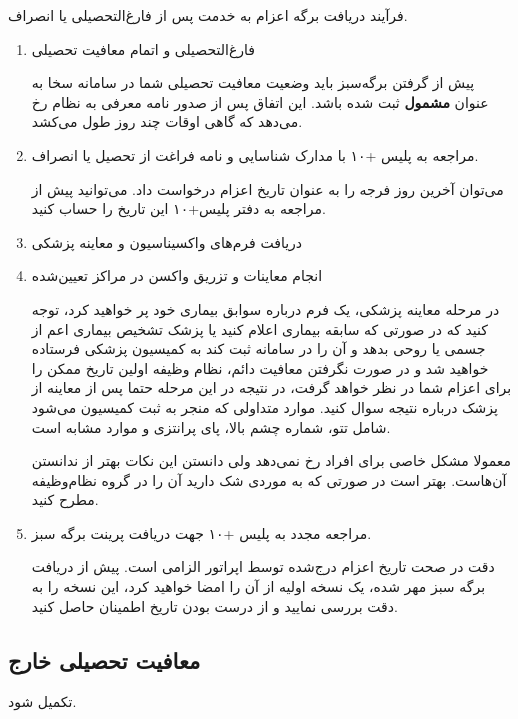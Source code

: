 فرآیند دریافت برگه اعزام به خدمت پس از فارغ‌التحصیلی یا انصراف.

\begin{enumerate}
    \item فارغ‌التحصیلی و اتمام معافیت تحصیلی
    \par\smallskip
    {\small
    پیش از گرفتن برگه‌سبز باید وضعیت معافیت تحصیلی شما در سامانه سخا به عنوان \textbf{مشمول} ثبت شده باشد.
    این اتفاق پس از صدور نامه معرفی به نظام رخ می‌دهد که گاهی اوقات چند روز طول می‌کشد.
    \par}

    \item مراجعه به پلیس +۱۰ با مدارک شناسایی و نامه فراغت از تحصیل یا انصراف.
    \par\smallskip
    {\small
    می‌توان آخرین روز فرجه را به عنوان تاریخ اعزام درخواست داد. می‌توانید پیش از مراجعه به دفتر پلیس+۱۰ این تاریخ 
    را حساب کنید. 
    \par}

    \item دریافت فرم‌های واکسیناسیون و معاینه پزشکی
    
    \item انجام معاینات و تزریق واکسن در مراکز تعیین‌شده
    \par\smallskip
    {\small
    در مرحله معاینه پزشکی، یک فرم درباره سوابق بیماری خود پر خواهید کرد، توجه کنید که در صورتی که سابقه بیماری اعلام کنید یا 
    پزشک تشخیص بیماری اعم از جسمی یا روحی بدهد و آن  را در سامانه ثبت کند به کمیسیون پزشکی فرستاده خواهید شد و در صورت 
    نگرفتن معافیت دائم، نظام وظیفه اولین تاریخ ممکن را برای اعزام شما در نظر خواهد گرفت، در نتیجه در این مرحله حتما پس از معاینه
    از پزشک درباره نتیجه سوال کنید. 
    موارد متداولی که منجر به ثبت کمیسیون می‌شود شامل تتو، شماره چشم بالا، پای پرانتزی و موارد مشابه است. 

    معمولا مشکل خاصی برای افراد رخ نمی‌دهد ولی دانستن این نکات بهتر از ندانستن آن‌هاست. بهتر است در صورتی که به موردی شک دارید آن را 
    در گروه نظام‌وظیفه مطرح کنید.
    \par}
    
    \item مراجعه مجدد به پلیس +۱۰ جهت دریافت پرینت برگه سبز.
    \par\smallskip
    {\small
    دقت در صحت تاریخ اعزام درج‌شده توسط اپراتور الزامی است. پیش از دریافت برگه سبز مهر شده، یک نسخه اولیه از آن را امضا 
    خواهید کرد، این نسخه را به دقت بررسی نمایید و از درست بودن تاریخ اطمینان حاصل کنید. 
    \par}
\end{enumerate}


\subsection{معافیت تحصیلی خارج}
تکمیل شود.